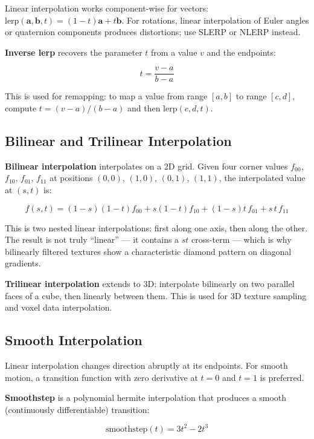 \documentclass[
  11pt,
  letterpaper,
  DIV=11,
  numbers=noendperiod,
  twoside,
  open=right]{scrreprt}
\begin{document}
Linear interpolation works component-wise for vectors:
\(\text{lerp}(\mathbf{a}, \mathbf{b}, t) = (1 - t) \mathbf{a} + t \mathbf{b}\).
For rotations, linear interpolation of Euler angles or quaternion
components produces distortions; use SLERP or NLERP instead.

\textbf{Inverse lerp} recovers the parameter \(t\) from a value \(v\)
and the endpoints:

\[
t = \frac{v - a}{b - a}
\]

This is used for remapping: to map a value from range \([a, b]\) to
range \([c, d]\), compute \(t = (v - a) / (b - a)\) and then
\(\text{lerp}(c, d, t)\).

\subsection{Bilinear and Trilinear
Interpolation}\label{bilinear-and-trilinear-interpolation}

\textbf{Bilinear interpolation} interpolates on a 2D grid. Given four
corner values \(f_{00}\), \(f_{10}\), \(f_{01}\), \(f_{11}\) at
positions \((0,0)\), \((1,0)\), \((0,1)\), \((1,1)\), the interpolated
value at \((s, t)\) is:

\[
f(s, t) = (1-s)(1-t) f_{00} + s(1-t) f_{10} + (1-s)t \, f_{01} + s \, t \, f_{11}
\]

This is two nested linear interpolations: first along one axis, then
along the other. The result is not truly ``linear'' --- it contains a
\(st\) cross-term --- which is why bilinearly filtered textures show a
characteristic diamond pattern on diagonal gradients.

\textbf{Trilinear interpolation} extends to 3D: interpolate bilinearly
on two parallel faces of a cube, then linearly between them. This is
used for 3D texture sampling and voxel data interpolation.

\subsection{Smooth Interpolation}\label{smooth-interpolation}

Linear interpolation changes direction abruptly at its endpoints. For
smooth motion, a transition function with zero derivative at \(t = 0\)
and \(t = 1\) is preferred.

\textbf{Smoothstep} is a polynomial hermite interpolation that produces
a smooth (continuously differentiable) transition:

\[
\text{smoothstep}(t) = 3t^2 - 2t^3
\]
\end{document}
